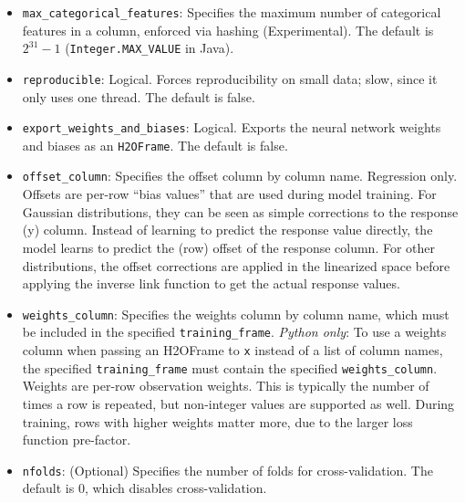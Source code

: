 {{{\begin{itemize}
\item \texttt{max\_categorical\_features}:  Specifies the maximum number of categorical features in a column, enforced via hashing (Experimental).  The default is $2^{31}-1$ (\texttt{Integer.MAX\_VALUE} in Java).

\item \texttt{reproducible}: Logical. Forces reproducibility on small data; slow, since it only uses one thread.  The default is false.

\item \texttt{export\_weights\_and\_biases}: Logical. Exports the neural network weights and biases as an \texttt{H2OFrame}.  The default is false.

%

\item \texttt{offset\_column}:  Specifies the offset column by column name.  Regression only.  Offsets are per-row ``bias values'' that are used during model training. For Gaussian distributions, they can be seen as simple corrections to the response (y) column. Instead of learning to predict the response value directly, the model learns to predict the (row) offset of the response column. For other distributions, the offset corrections are applied in the linearized space before applying the inverse link function to get the actual response values. 

\item \texttt{weights\_column}: Specifies the weights column by column name, which must be included in the specified \texttt{training\_frame}. \textit{Python only}: To use a weights column when passing an H2OFrame to \texttt{x} instead of a list of column names, the specified \texttt{training\_frame} must contain the specified \texttt{weights\_column}. Weights are per-row observation weights. This is typically the number of times a row is repeated, but non-integer values are supported as well. During training, rows with higher weights matter more, due to the larger loss function pre-factor.

\item \texttt{nfolds}: (Optional) Specifies the number of folds for cross-validation. %
The default is 0, which disables cross-validation.


\end{itemize}}}}
